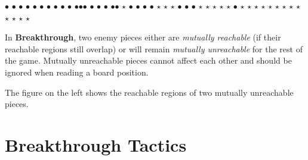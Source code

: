 \documentclass[a4paper,12pt]{article}
\newcommand{\BT}{\textbf{Breakthrough}\xspace}  %
\begin{document}
    \begin{minipage}[c]{0.36\linewidth}
        \begin{center}
            \begin{othelloboardnorefs}{0.75}
                \annotationsfirstrow	{} {$\bullet$} {$\bullet$} {$\bullet$} {$\bullet$} {$\bullet$} {$\bullet$} {$\bullet$}
                \annotationssecondrow	{} {} {$\bullet$} {$\bullet$} {$\bullet$} {$\bullet$}{$\bullet$}{$\bullet$}
                \annotationsthirdrow	{} {} {} {$\bullet$} {$\bullet$} {$\bullet$} {$\bullet$}{$\bullet$}
                \annotationsfourthrow	{} {} {} {$\star$} {$\bullet$} {$\bullet$} {$\bullet$} {$\bullet$}
                \annotationsfifthrow	{} {} {$\star$} {$\star$} {$\star$} {$\bullet$} {$\bullet$} {$\bullet$}
                \annotationssixthrow	{} {$\star$} {$\star$} {$\star$} {$\star$} {$\star$} {$\bullet$} {}
                \annotationsseventhrow	{$\star$} {$\star$} {$\star$} {$\star$} {$\star$} {$\star$} {$\star$} {}
                \annotationseighthrow	{$\star$} {$\star$} {$\star$} {$\star$} {$\star$} {$\star$} {$\star$} {$\star$}
            \end{othelloboardnorefs}
        \end{center}
    \end{minipage}
    \hfill
    \begin{minipage}[c]{0.62\linewidth}
        In \BT, two enemy pieces either are \emph{mutually reachable} (if their reachable regions still overlap) or will remain \emph{mutually unreachable} for the rest of the game.  Mutually unreachable pieces cannot affect each other and should be ignored when reading a board position.

        The figure on the left shows the reachable regions of two mutually unreachable pieces.
    \end{minipage}

    \section{\BT Tactics}
\end{document}
